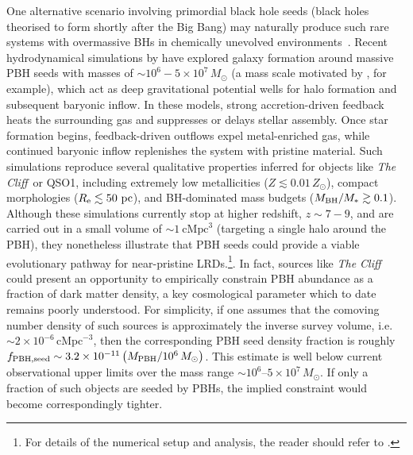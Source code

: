 \documentclass[fleqn,usenatbib]{mnras}
\newcommand{\cliff}{\textit{The Cliff}\xspace}
\begin{document}
One alternative scenario involving primordial black hole seeds (black holes theorised to form shortly after the Big Bang) may naturally produce such rare systems with overmassive BHs in chemically unevolved environments~\citep[for a review, see][]{Carr2020}. Recent hydrodynamical simulations by \citet{Zhang2025_hydrosim_QSO1,Zhang2025_hydrosim} have explored galaxy formation around massive PBH seeds with masses of $\sim 10^{6}-5\times10^{7}\,M_\odot$ (a mass scale motivated by \citealt{Carr2021PDU....3100755C}, for example), which act as deep gravitational potential wells for halo formation and subsequent baryonic inflow. In these models, strong accretion-driven feedback heats the surrounding gas and suppresses or delays stellar assembly. Once star formation begins, feedback-driven outflows expel metal-enriched gas, while continued baryonic inflow replenishes the system with pristine material. Such simulations reproduce several qualitative properties inferred for objects like \cliff\ or QSO1, including extremely low metallicities ($Z \lesssim 0.01\,Z_\odot$), compact morphologies ($R_{\rm e}\lesssim 50~\mathrm{pc}$), and BH-dominated mass budgets ($M_{\rm BH}/M_\ast \gtrsim 0.1$). Although these simulations currently stop at higher redshift, $z\sim7-9$, and are carried out in a small volume of $\sim 1~\mathrm{cMpc}^3$ (targeting a single halo around the PBH), they nonetheless illustrate that PBH seeds could provide a viable evolutionary pathway for near-pristine LRDs.\footnote{For details of the numerical setup and analysis, the reader should refer to \citet{Zhang2025_hydrosim, Zhang2025_hydrosim_QSO1}.}.
In fact, sources like \cliff could present an opportunity to empirically constrain PBH abundance as a fraction of dark matter density, a key cosmological parameter \citep[see e.g.][]{Carr2021} which to date remains poorly understood. For simplicity, if one assumes that the comoving number density of such sources is approximately the inverse survey volume, i.e. $\sim 2\times10^{-6}\,\mathrm{cMpc}^{-3}$, then the corresponding PBH seed density fraction is roughly $f_{\rm PBH, seed} \sim 3.2\times10^{-11} \left(M_{\rm PBH} / 10^{6}\, M_\odot\right)$. This estimate is well below current observational upper limits over the mass range $\sim10^{6}$--$5\times10^{7}\,M_\odot$. If only a fraction of such objects are seeded by PBHs, the implied constraint would become correspondingly tighter.
\end{document}
